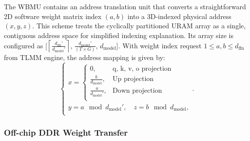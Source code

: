 \documentclass[sigconf]{acmart}
\begin{document}
The WBMU contains an address translation unit that converts a straightforward 2D software weight matrix index $(a, b)$ into a 3D-indexed physical address $(x, y, z)$. This scheme treats the cyclically partitioned URAM array as a single, contiguous address space for simplified indexing explanation. Its array size is configured as [$\left \lceil \frac{d_{\text{ffn}}'}{d_{\text{model}}'} \right \rceil$, $\frac{d_{\text{model}}'}{(T\times G)}$, $d_{\text{model}}$]. With weight index request $1 \leq a,b\leq d_{\text{ffn}}$ from TLMM engine, the address mapping is given by:
\begin{equation}
\begin{cases}
x = \begin{cases}
        0, &\text{q, k, v, o projection}\\
        \frac{b}{d_{\text{model}}} , &\text{Up projection} \\
        \frac{a}{  d_{\text{model}}'}, &\text{Down projection} \\
    \end{cases}\\

y = a \mod  d_{\text{model}}', \quad
z = b \mod d_{\text{model}}, \\
\end{cases}.
\end{equation}


\subsubsection{Off-chip DDR Weight Transfer}
\end{document}
